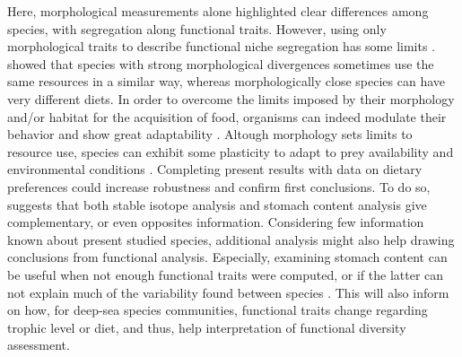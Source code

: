 Here, morphological measurements alone highlighted clear differences among species, with segregation along functional traits. However, using only morphological traits to describe functional niche segregation has some limits \citep{dasilva2019}. \citet{grossman2009} showed that species with strong morphological divergences sometimes use the same resources in a similar way, whereas morphologically close species can have very different diets. In order to overcome the limits imposed by their morphology and/or habitat for the acquisition of food, organisms can indeed modulate their behavior and show great adaptability \citep{blondel1979,grossman2009}. Altough morphology sets limits to resource use, species can exhibit some plasticity to adapt to prey availability and environmental conditions \citep{ibanez2007,sibbing2000}. Completing present results with data on dietary preferences could increase robustness and confirm first conclusions. To do so, \citet{preciado2017} suggests that both stable isotope analysis and stomach content analysis give complementary, or even opposites information. Considering few information known about present studied species, additional analysis might also help drawing conclusions from functional analysis. Especially, examining stomach content can be useful when not enough functional traits were computed, or if the latter can not explain much of the variability found between species \citep{albouy2011}. This will also inform on how, for deep-sea species communities, functional traits change regarding trophic level or diet, and thus, help interpretation of functional diversity assessment. \\




